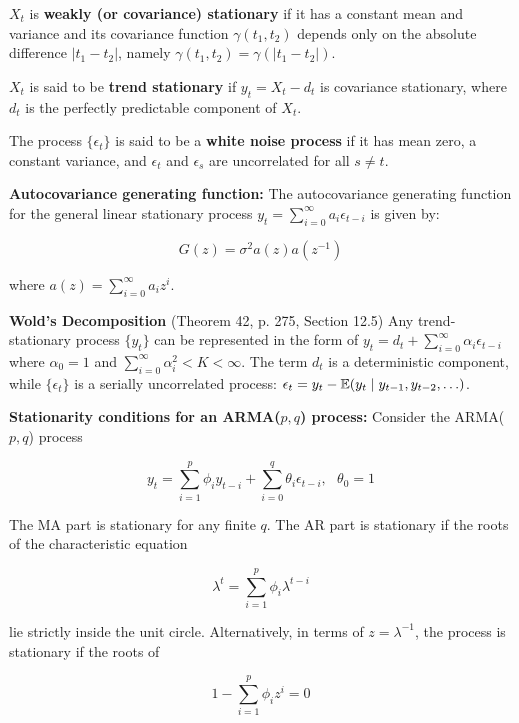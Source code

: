 \begin{definition}\label{tf.def.cov.stationary} \(X_t\) is \textbf{weakly (or covariance) stationary} if it has a constant mean and variance and its covariance function \(\gamma(t_1, t_2)\) depends only on the absolute difference \(| t_1 - t_2|\), namely \(\gamma(t_1, t_2) = \gamma(|t_1 - t_2|)\).
\end{definition}

\begin{definition}\label{ts.12.trendstationary}\(X_t\) is said to be \textbf{trend stationary} if \(y_t = X_t - d_t\) is covariance stationary, where \(d_t\) is the perfectly predictable component of \(X_t\).
\end{definition}

The process \(\{\epsilon_t\} \) is said to be a \textbf{white noise process} if it has mean zero, a constant variance, and \(\epsilon_t\) and \(\epsilon_s\) are uncorrelated for all \(s \neq t\).

\textbf{Autocovariance generating function:} The autocovariance generating function for the general linear stationary process \(y_t = \sum_{i=0}^\infty a_i \epsilon_{t-i}\) is given by:

\[
G(z) = \sigma^2 a(z)a(z^{-1})
\]

where \(a(z) = \sum_{i=0}^\infty a_i z^i\). 

\textbf{Wold's Decomposition} (Theorem 42, p. 275, Section 12.5) Any trend-stationary process \(\{y_t\}\) can be represented in the form of \(y_t = d_t + \sum_{i=0}^\infty \alpha_i \epsilon_{t-i}\) where \(\alpha_0 = 1\) and \(\sum_{i=0}^\infty \alpha_i^2 < K < \infty\). The term \(d_t\) is a deterministic component, while \(\{\epsilon_t\}\) is a serially uncorrelated process: \(\epsilon_t = y_t - \E(y_t \mid y_{t-1}, y_{t-2}, \ldots) \).

\textbf{Stationarity conditions for an ARMA(\(p,q\)) process:} Consider the ARMA(\(p, q\)) process 

\[
y_t = \sum_{i=1}^p \phi_i y_{t-i} + \sum_{i=0}^q \theta_i \epsilon_{t-i}, \ \ \ \theta_0 = 1
\]

The MA part is stationary for any finite \(q\). The AR part is stationary if the roots of the characteristic equation

\[
\lambda^t = \sum_{i=1}^p \phi_i \lambda^{t-i}
\]

lie strictly inside the unit circle. Alternatively, in terms of \(z = \lambda^{-1}\), the process is stationary if the roots of 

\[
1 - \sum_{i=1}^p \phi_i z^i = 0
\]

